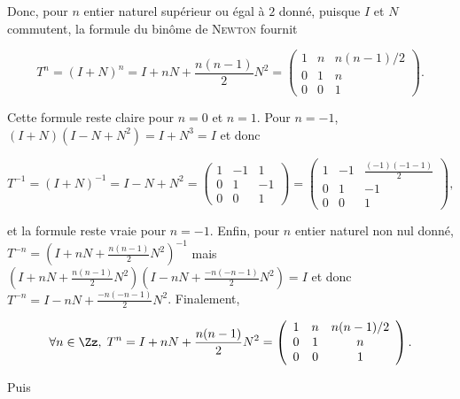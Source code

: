 {\begin{enumerate}
{Donc, pour $n$  entier naturel supérieur ou égal à $2$ donné, puisque $I$ et $N$ commutent, la formule du binôme de \textsc{Newton} fournit 

$$T^n=(I+N)^n=I+nN+\frac{n(n-1)}{2}N^2=\left(
\begin{array}{ccc}
1&n&n(n-1)/2\\
0&1&n\\
0&0&1
\end{array}
\right).$$

Cette formule reste claire pour $n=0$ et $n=1$.
Pour $n=-1$, $(I+N)(I-N+N^2)=I+N^3=I$ et donc

$$T^{-1}=(I+N)^{-1}=I-N+N^2=\left(
\begin{array}{ccc}
1&-1&1\\
0&1&-1\\
0&0&1
\end{array}
\right)=\left(
\begin{array}{ccc}
1&-1&\frac{(-1)(-1-1)}{2}\\
0&1&-1\\
0&0&1
\end{array}
\right),$$

et la formule reste vraie pour $n=-1$. Enfin, pour $n$ entier naturel non nul donné, $T^{-n}=(I+nN+\frac{n(n-1)}{2}N^2)^{-1}$ mais $(I+nN+\frac{n(n-1)}{2}N^2)(I-nN+\frac{-n(-n-1)}{2}N^2)=I$ et donc
$T^{-n}=I-nN+\frac{-n(-n-1)}{2}N^2$. Finalement, 

$$\forall n\in\Zz,\;T^n=I+nN+\frac{n(n-1)}{2}N^2=\left(
\begin{array}{ccc}
1&n&n(n-1)/2\\
0&1&n\\
0&0&1
\end{array}
\right).$$

Puis 

}
\end{enumerate}}
